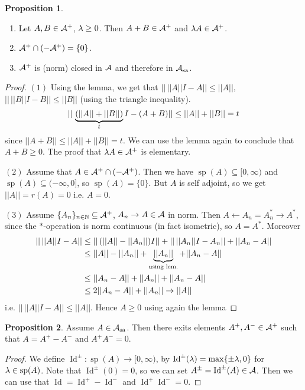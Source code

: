 \documentclass[10pt,english,a4paper]{article}
\theoremstyle{definition}
\newtheorem*{proposition}{Proposition}
\def\Assa{\As_{\text{sa}}}
\DeclareMathOperator{\Id}{Id}
\DeclareMathOperator{\Sp}{sp}
\begin{document}
\begin{proposition}
\begin{enumerate}[(1)]
    \leavevmode
    \item Let $A,B \in \mathcal{A}^+$, $\lambda \geq 0$. Then $A+B \in \mathcal{A}^+$ and 
    $\lambda A \in \mathcal{A}^+$.

    \item $\mathcal{A}^+ \cap (-\mathcal{A}^+) = \{0\}$. 

    \item $\mathcal{A}^+$ is (norm) closed in $\mathcal{A}$ and therefore in $\Assa$.

\end{enumerate}   
\begin{proof}
    $(1)$ Using the lemma, we get that 
    $||\,||A|| I -A|| \leq ||A||$, $||\, ||B|| I - B || \leq ||B||$ (using the 
triangle inequality). 
    \[ ||\,\underbrace{(||A|| +||B||)}_{t} I - (A+B) || \leq ||A|| + ||B|| = t \]
    since $||A+B|| \leq ||A|| + ||B|| = t$. We can use the lemma again to conclude that
    $A+B \geq 0$. The proof that $\lambda A \in \mathcal{A}^+$ is elementary.

    $(2)$ Assume that $A \in \mathcal{A}^+\cap (-\mathcal{A}^+)$. Then we have $\Sp(A)\subseteq[0,\infty)$ 
and $\Sp(A)\subseteq (-\infty,0]$, so $\Sp(A) = \{0\}$. But $A$ is self adjoint, 
so we get $||A|| = r(A) = 0$ i.e. $A = 0$.

$(3)$ Assume $\{A_n\}_{n\in\mathbb{N}} \subseteq \mathcal{A}^+$, $A_n\to A \in \mathcal{A}$ in norm.
Then $A \leftarrow A_n = A_{n}^{*} \to A^{*}$, since the $*$-operation is norm 
continuous (in fact isometric), so $A = A^*$.
Moreover 
\begin{align*}
    ||\,||A||I-A||&\leq ||\,(||A|| -||A_n||)I|| + ||\,||A_n|| I - A_n|| + 
    ||A_n - A|| \\
    &\leq ||A|| - ||A_n|| + \underbrace{||A_n ||}_{\text{using lem.}} + ||A_n - A|| \\
    &\leq ||A_n - A|| + ||A_n|| + ||A_n-A|| \\
    &\leq 2||A_n-A|| + ||A_n|| \to ||A||
\end{align*}
i.e. $||\,||A|| I - A || \leq ||A||$. Hence $A\geq 0$ using again the lemma
\end{proof}
\end{proposition}
\begin{proposition}
    Assume $A \in \Assa$. Then there exits elements $A^+, A^- \in \mathcal{A}^+$ such that 
    $A = A^+ -A^-$ and $A^+A^- = 0$.
\end{proposition}
\begin{proof}
    We define $\Id^{\pm} \colon \Sp(A) \to [0,\infty)$, by 
    $\Id^{\pm}(\la) = \max\{\pm \la, 0\}$ for $\la \in \Sp(A)$.
    Note that $\Id^{\pm} (0) = 0$, so we can set $A^{\pm} =\Id^{\pm}(A) \in \As$.
    Then we can use that $\Id = \Id^{+} - \Id^{-}$ and $\Id^+ \Id^{-}=0$.
\end{proof}
\end{document}
